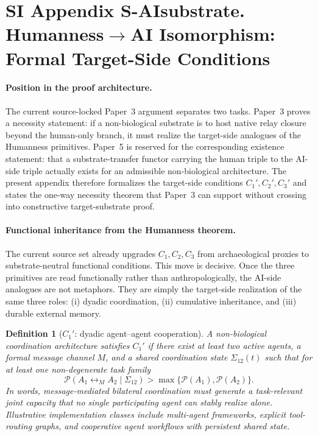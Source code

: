 \documentclass[11pt]{article}
\newtheorem{definition}{Definition}
\begin{document}
\section*{SI Appendix S-AIsubstrate. Humanness$\to$AI Isomorphism: Formal Target-Side Conditions}
\label{sec:S-AIsubstrate}

\paragraph{Position in the proof architecture.}
The current source-locked Paper~3 argument separates two tasks.
Paper~3 proves a necessity statement:
if a non-biological substrate is to host native relay closure beyond the
human-only branch,
it must realize the target-side analogues of the Humanness primitives.
Paper~5 is reserved for the corresponding existence statement:
that a substrate-transfer functor carrying the human triple to the AI-side
triple actually exists for an admissible non-biological architecture.
The present appendix therefore formalizes the target-side conditions
$C_1',C_2',C_3'$
and states the one-way necessity theorem that Paper~3 can support without
crossing into constructive target-substrate proof.

\paragraph{Functional inheritance from the Humanness theorem.}
The current source set already upgrades
$C_1,C_2,C_3$
from archaeological proxies to substrate-neutral functional conditions.
This move is decisive.
Once the three primitives are read functionally rather than anthropologically,
the AI-side analogues are not metaphors.
They are simply the target-side realization of the same three roles:
(i) dyadic coordination,
(ii) cumulative inheritance,
and
(iii) durable external memory.

\begin{definition}[$C_1'$: dyadic agent--agent cooperation]
\label{def:C1prime}
A non-biological coordination architecture satisfies
$C_1'$
if there exist at least two active agents,
a formal message channel
$M$,
and a shared coordination state
$\Sigma_{12}(t)$
such that for at least one non-degenerate task family
\begin{equation}
\mathcal{P}(A_1 \leftrightarrow_M A_2\mid \Sigma_{12})
>
\max\bigl\{
\mathcal{P}(A_1),
\mathcal{P}(A_2)
\bigr\}.
\label{eq:S-AIsubstrate-C1prime}
\end{equation}
In words,
message-mediated bilateral coordination must generate a task-relevant joint
capacity that no single participating agent can stably realize alone.
Illustrative implementation classes include multi-agent frameworks,
explicit tool-routing graphs,
and cooperative agent workflows with persistent shared state.
\end{definition}
\end{document}
